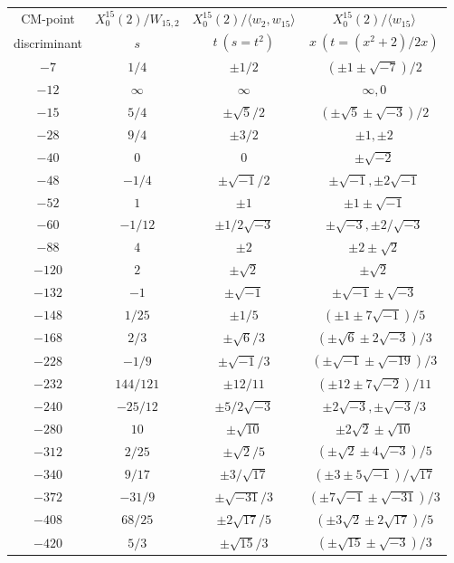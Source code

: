 \documentclass{amsart}
\theoremstyle{definition}
\def\gen#1{\langle #1\rangle}
\begin{document}
\begin{appendices}
\renewcommand{\arraystretch}{1.5}
\tabcolsep=10pt                         
\begin{table}
\begin{tabular}{|c|c|c|c|}
\hline
CM-point& $X_{0}^{15}(2) /W_{15,2}$ & $X_{0}^{15}(2)/\gen{w_2,w_{15}}$
  & $X_0^{15}(2)/\gen{w_{15}}$ \\ 
discriminant & $s$ & $t\ (s=t^2)$ & $x\ (t=(x^2+2)/2x)$ \\ \hline
$-7$ & $1/4$ & $\pm 1/2$ & $(\pm 1\pm\sqrt{-7})/2$ \\
$-12$ & $\infty$ & $\infty$ & $\infty,0$ \\
$-15$ & $5/4$ & $\pm\sqrt5/2$ & $(\pm\sqrt5\pm\sqrt{-3})/2$ \\
$-28$ & $9/4$ & $\pm3/2$ & $\pm1,\pm2$ \\
$-40$ & $0$ & $0$ & $\pm\sqrt{-2}$ \\
$-48$ & $-1/4$ & $\pm\sqrt{-1}/2$ & $\pm\sqrt{-1},\pm2\sqrt{-1}$ \\
$-52$ & $1$ & $\pm 1$ & $\pm1\pm\sqrt{-1}$ \\
$-60$ & $-1/12$ & $\pm1/2\sqrt{-3}$ & $\pm\sqrt{-3},\pm2/\sqrt{-3}$ \\
$-88$ & $4$ & $\pm2$ & $\pm2\pm\sqrt2$ \\
$-120$ & $2$ & $\pm\sqrt2$ & $\pm\sqrt2$ \\
$-132$ & $-1$ & $\pm\sqrt{-1}$ & $\pm\sqrt{-1}\pm\sqrt{-3}$ \\
$-148$ & $1/25$ & $\pm1/5$ & $(\pm1\pm7\sqrt{-1})/5$ \\
$-168$ & $2/3$ & $\pm\sqrt{6}/3$ & $(\pm\sqrt6\pm2\sqrt{-3})/3$ \\
$-228$ & $-1/9$ & $\pm\sqrt{-1}/3$ & $(\pm\sqrt{-1}\pm\sqrt{-19})/3$
  \\
$-232$ & $144/121$ & $\pm 12/11$ & $(\pm12\pm7\sqrt{-2})/11$ \\
$-240$ & $-25/12$ & $\pm5/2\sqrt{-3}$ & $\pm2\sqrt{-3},\pm\sqrt{-3}/3$
  \\
$-280$ & $10$ & $\pm\sqrt{10}$ & $\pm2\sqrt2\pm\sqrt{10}$ \\
$-312$ & $2/25$ & $\pm\sqrt2/5$ & $(\pm\sqrt2\pm4\sqrt{-3})/5$ \\
$-340$ & $9/17$ & $\pm3/\sqrt{17}$ & $(\pm3\pm5\sqrt{-1})/\sqrt{17}$
  \\
$-372$ & $-31/9$ & $\pm\sqrt{-31}/3$ &
         $(\pm7\sqrt{-1}\pm\sqrt{-31})/3$ \\
$-408$ & $68/25$ & $\pm2\sqrt{17}/5$ & $(\pm3\sqrt2\pm2\sqrt{17})/5$
  \\
$-420$ & $5/3$ & $\pm\sqrt{15}/3$ & $(\pm\sqrt{15}\pm\sqrt{-3})/3$ \\

\end{tabular}
\end{table}
\end{appendices}
\end{document}

